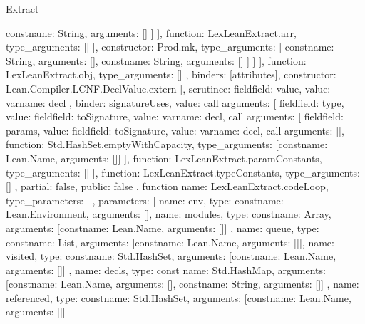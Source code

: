 \begin{lexlean}{Extract}
\begin{toolingmodule}
{{{{{{{{{{                                  const{name: String, arguments: []}
                                ]
                              }
                            ],
                            function: LexLeanExtract.arr,
                            type_arguments: []
                          }
                        ],
                        constructor: Prod.mk,
                        type_arguments: [
                          const{name: String, arguments: []},
                          const{name: String, arguments: []}
                        ]
                      }
                    ]
                  }
                ],
                function: LexLeanExtract.obj,
                type_arguments: []
              },
              binders: [attributes],
              constructor: Lean.Compiler.LCNF.DeclValue.extern
            }
          ],
          scrutinee: field{field: value, value: var{name: decl}}
        },
        binder: signatureUses,
        value: call{
          arguments: [
            field{field: type, value: field{field: toSignature, value: var{name: decl}}},
            call{
              arguments: [
                field{field: params, value: field{field: toSignature, value: var{name: decl}}},
                call{
                  arguments: [],
                  function: Std.HashSet.emptyWithCapacity,
                  type_arguments: [const{name: Lean.Name, arguments: []}]
                }
              ],
              function: LexLeanExtract.paramConstants,
              type_arguments: []
            }
          ],
          function: LexLeanExtract.typeConstants,
          type_arguments: []
        }
      },
      partial: false,
      public: false
    },
    function{
      name: LexLeanExtract.codeLoop,
      type_parameters: [],
      parameters: [
        {name: env, type: const{name: Lean.Environment, arguments: []}},
        {
          name: modules,
          type: const{name: Array, arguments: [const{name: Lean.Name, arguments: []}]}
        },
        {name: queue, type: const{name: List, arguments: [const{name: Lean.Name, arguments: []}]}},
        {
          name: visited,
          type: const{name: Std.HashSet, arguments: [const{name: Lean.Name, arguments: []}]}
        },
        {
          name: decls,
          type: const{
            name: Std.HashMap,
            arguments: [const{name: Lean.Name, arguments: []}, const{name: String, arguments: []}]
          }
        },
        {
          name: referenced,
          type: const{name: Std.HashSet, arguments: [const{name: Lean.Name, arguments: []}]}
}}}
\end{toolingmodule}
\end{lexlean}
